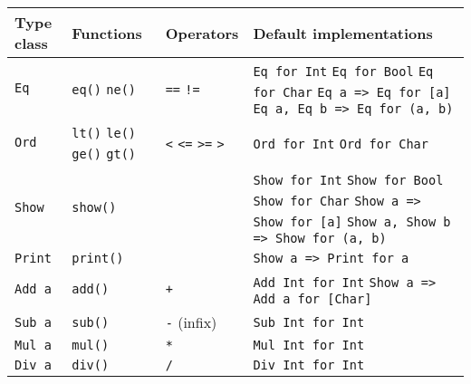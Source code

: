 \begin{table}[H]
\centering
\begin{tabular}{|p{5em}|p{5em}|p{5em}|p{20em}|}
\hline
Type class & Functions & Operators & Default implementations \\ \hline
\lstinline|Eq| & \lstinline|eq()| \newline \lstinline|ne()| & \lstinline|==| \newline \lstinline|!=| & \lstinline|Eq for Int| \newline \lstinline|Eq for Bool| \newline \lstinline|Eq for Char| \newline \lstinline|Eq a => Eq for [a]| \newline \lstinline|Eq a, Eq b => Eq for (a, b)| \\ \hline
\lstinline|Ord| & \lstinline|lt()| \newline \lstinline|le()| \newline \lstinline|ge()| \newline \lstinline|gt()| & \lstinline|<| \newline \lstinline|<=| \newline \lstinline|>=| \newline \lstinline|>| & \lstinline|Ord for Int| \newline \lstinline|Ord for Char| \\ \hline
\lstinline|Show| & \lstinline|show()| & \lstinline|| & \lstinline|Show for Int| \newline \lstinline|Show for Bool| \newline \lstinline|Show for Char| \newline \lstinline|Show a => Show for [a]| \newline \lstinline|Show a, Show b => Show for (a, b)| \\ \hline
\lstinline|Print| & \lstinline|print()| & \lstinline|| & \lstinline|Show a => Print for a| \\ \hline
\lstinline|Add a| & \lstinline|add()| & \lstinline|+| & \lstinline|Add Int for Int| \newline \lstinline|Show a => Add a for [Char]| \\ \hline
\lstinline|Sub a| & \lstinline|sub()| & \lstinline|-| (infix) & \lstinline|Sub Int for Int| \\ \hline
\lstinline|Mul a| & \lstinline|mul()| & \lstinline|*| & \lstinline|Mul Int for Int| \\ \hline
\lstinline|Div a| & \lstinline|div()| & \lstinline|/| & \lstinline|Div Int for Int| \\ \hline

\end{tabular}
\end{table}

